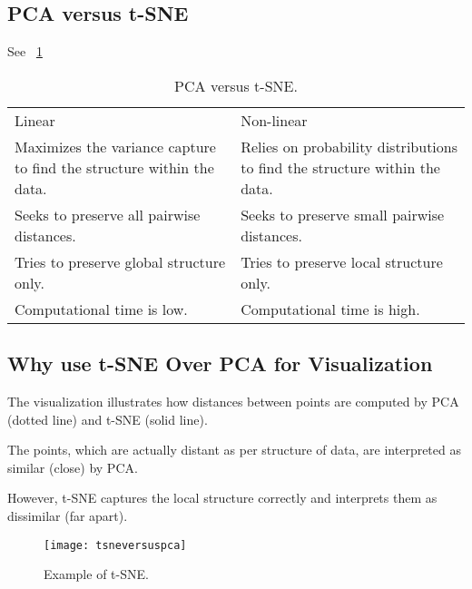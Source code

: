 	\subsection{PCA versus t-SNE}
See \tablename~\ref{tab:pcaversustsne}
	\begin{table}
        \centering
        \caption[PCA versus t-SNE]{PCA versus t-SNE.}
        \label{tab:pcaversustsne}
		\begin{tabular}{|p{}|p{}|} \hline
				\tablecolumnheadervlinesone{PCA} & \tablecolumnheadervlinestwo{t-SNE} \\ \hline
				Linear &
	            Non-linear \\ \hline
				Maximizes the variance capture to find the structure within the data. &
				Relies on probability distributions to find the structure within the data.  \\ \hline
				Seeks to preserve all pairwise distances. &
				Seeks to preserve small pairwise distances. \\ \hline
				Tries to preserve global structure only. &
				Tries to preserve local structure only. \\ \hline
				Computational time is low. &
				Computational time is high. \\ \hline
		\end{tabular}
	\end{table}


	\subsection{Why use t-SNE Over PCA for Visualization}
	\begin{bulletedlist}
		\item The visualization illustrates how distances between points are computed by PCA (dotted line) and t-SNE (solid line).
		\item The points, which are actually distant as per structure of data, are interpreted as similar (close) by PCA.
		\item However, t-SNE captures the local structure correctly and interprets them as dissimilar (far apart).
	\end{bulletedlist}

 	\begin{figure}[htb]
		\centering
		\texttt{[image: tsneversuspca]}
		\caption[Example of t-SNE]{Example of t-SNE.}
		\label{fig:tsneversuspca}
	\end{figure}

